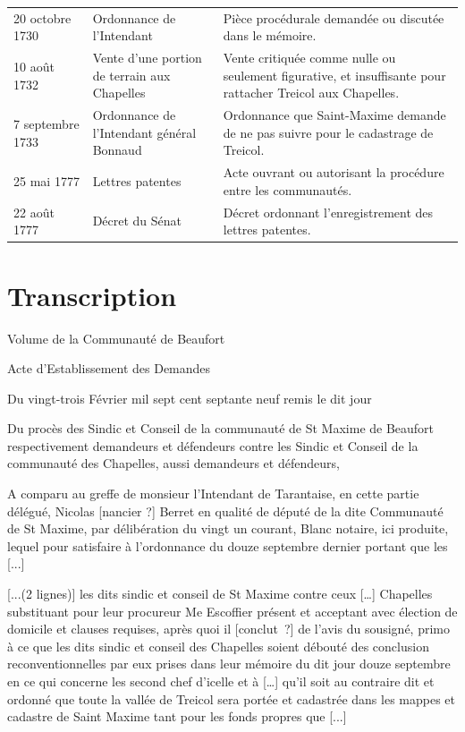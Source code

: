 \documentclass[a4paper,twoside,openany]{article}
\begin{document}
\begin{longtable}{p{3cm}p{5.2cm}p{7cm}}
20 octobre 1730 & Ordonnance de l'Intendant & Pièce procédurale demandée ou discutée dans le mémoire. \\
10 août 1732 & Vente d'une portion de terrain aux Chapelles & Vente critiquée comme nulle ou seulement figurative, et insuffisante pour rattacher Treicol aux Chapelles. \\
7 septembre 1733 & Ordonnance de l'Intendant général Bonnaud & Ordonnance que Saint-Maxime demande de ne pas suivre pour le cadastrage de Treicol. \\
25 mai 1777 & Lettres patentes & Acte ouvrant ou autorisant la procédure entre les communautés. \\
22 août 1777 & Décret du Sénat & Décret ordonnant l'enregistrement des lettres patentes. \\
\bottomrule
\end{longtable}

\section{Transcription}


Volume de la Communauté de Beaufort

Acte d'Establissement des Demandes

Du vingt-trois Février mil sept cent septante neuf remis le dit jour

Du procès des Sindic et Conseil de la communauté de St Maxime de Beaufort respectivement demandeurs et défendeurs contre les Sindic et Conseil de la communauté des Chapelles, aussi demandeurs et défendeurs,

A comparu au greffe de monsieur l'Intendant de Tarantaise, en cette partie délégué, Nicolas [nancier ?]  Berret en qualité de député de la dite Communauté de St Maxime, par délibération du vingt un courant, Blanc notaire, ici produite, lequel pour satisfaire à l'ordonnance du douze septembre dernier portant que les [...]


[...(2 lignes)] les dits sindic et conseil de St Maxime contre ceux […] Chapelles substituant pour leur procureur Me Escoffier présent et acceptant avec élection de domicile et clauses requises, après quoi il [conclut~?] de l’avis du sousigné, primo à ce que les dits sindic et conseil des Chapelles soient débouté des conclusion reconventionnelles par eux prises dans leur mémoire du dit jour douze septembre en ce qui concerne les second chef d’icelle et à […] qu’il soit au contraire dit et ordonné que toute la vallée de Treicol sera portée et cadastrée dans les mappes et cadastre de Saint Maxime tant pour les fonds propres que [...]
\end{document}
